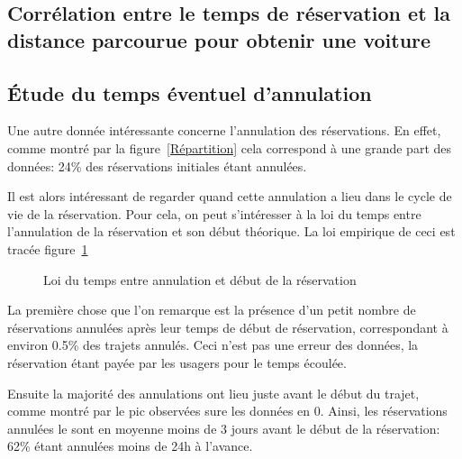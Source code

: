 \documentclass[12pt,a4paper]{article}
\theoremstyle{definition}
\begin{document}
{\subsection{Corrélation entre le temps de réservation et la distance parcourue pour obtenir une voiture}

\subsection{Étude du temps éventuel d'annulation}



Une autre donnée intéressante concerne l'annulation des réservations. En effet, comme montré par la figure~\ref{Répartition} cela correspond à une grande part des données: 24\% des réservations initiales étant annulées. 

Il est alors intéressant de regarder quand cette annulation a lieu dans le cycle de vie de la réservation. Pour cela, on peut s'intéresser à la loi du temps entre l'annulation de la réservation et son début théorique. La loi empirique de ceci est tracée figure~\ref{délai_annulation_début} 

\begin{figure}[!h]
\centering
{}
\caption{Loi du temps entre annulation et début de la réservation}
\label{délai_annulation_début}
\end{figure}


La première chose que l'on remarque est la présence d'un petit nombre de réservations annulées après leur temps de début de réservation, correspondant à environ 0.5\% des trajets annulés. Ceci n'est pas une erreur des données, la réservation étant payée par les usagers pour le temps écoulée.

Ensuite la majorité des annulations ont lieu juste avant le début du trajet, comme montré par le pic observées sure les données en 0. Ainsi, les réservations annulées le sont en moyenne moins de 3 jours avant le début de la réservation: 62\% étant annulées moins de 24h à l'avance.

}
\end{document}

